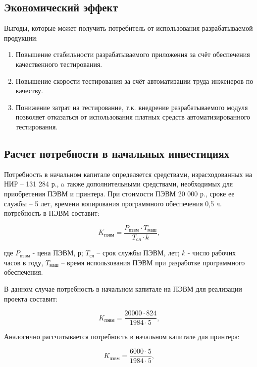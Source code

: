 \subsection{Экономический эффект}

Выгоды, которые может получить потребитель от использования разрабатываемой продукции:

\begin{enumerate}
\item Повышение стабильности разрабатываемого приложения за счёт обеспечения качественного тестирования.
\item Повышение скорости тестирования за счёт автоматизации труда инженеров по качеству.
\item Понижение затрат на тестирование, т.к. внедрение разрабатываемого модуля позволяет отказаться от
использования платных средств автоматизированного тестирования.
\end{enumerate}

\subsection{Расчет потребности в начальных инвестициях}

Потребность в начальном капитале определяется средствами, израсходованных на НИР – 131 284 р.,
a также дополнительными средствами, необходимых для приобретения ПЭВМ и принтера. При стоимости ПЭВМ 20 000 р.,
сроке ее службы – 5 лет, времени копирования программного обеспечения 0,5 ч. потребность в ПЭВМ составит:

\begin{equation}
K_{пэвм} = \frac{P_{пэвм} \cdot T_{маш}}{T_{сл} \cdot k}\mbox{,}
\label{F:F7}
\end{equation}

где $P_{пэвм}$ - цена ПЭВМ, р; $T_{сл}$ – срок службы ПЭВМ, лет; $k$ - число рабочих часов в году,
$T_{маш}$ – время использования ПЭВМ при разработке программного обеспечения.

В данном случае потребность в начальном капитале на ПЭВМ для реализации проекта составит:

\begin{equation}
K_{пэвм} = \frac{20000 \cdot 824}{1984 \cdot 5}\mbox{,}
\label{F:F8}
\end{equation}

Аналогично рассчитывается потребность в начальном капитале для принтера:

\begin{equation}
K_{пэвм} = \frac{6000 \cdot 5}{1984 \cdot 5}\mbox{,}
\label{F:F9}
\end{equation}

